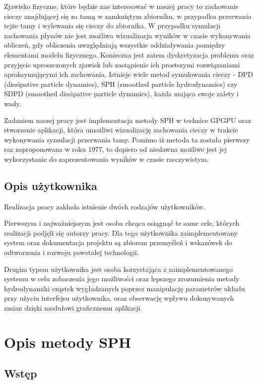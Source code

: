 \documentclass[polish, 12pt]{aghthesis}
\begin{document}
	Zjawisko fizyczne, które będzie nas interesować w naszej pracy to zachowanie cieczy znajdującej się za tamą w zamkniętym zbiorniku, w przypadku przerwania tejże tamy i wylewania się cieczy do zbiornika. W przypadku symulacji zachowania płynów nie jest możliwa wizualizacja wyników w czasie wykonywania obliczeń, gdy obliczenia uwzględniają wszystkie oddziaływania pomiędzy elementami modelu fizycznego. Konieczna jest zatem dyskretyzacja problemu oraz przyjęcie uproszczonych zjawisk lub zastąpienie ich prostszymi rozwiązaniami aproksymującymi ich zachowania. Istnieje wiele metod symulowania cieczy - DPD (dissipative particle dynamics), SPH (smoothed particle hydrodynamics) czy SDPD (smoothed dissipative particle dynamics), każda mająca swoje zalety i wady.

	Zadaniem naszej pracy jest implementacja metody SPH w technice GPGPU oraz stworzenie aplikacji, która umożliwi wizualizację zachowania cieczy w trakcie wykonywania symulacji przerwania tamy. Pomimo iż metoda ta została pierwszy raz zaproponowana w roku 1977, to dopiero od niedawna możliwe jest jej wykorzystanie do zaprezentowania wyników w czasie rzeczywistym.

\subsection{Opis użytkownika}
	
	Realizacja pracy zakłada istnienie dwóch rodzajów użytkowników.
	
	Pierwszym i najważniejszym jest osoba chcąca osiągnąć te same cele, których realizacji podjęli się autorzy pracy. Dla tego użytkownika zaimplementowany system oraz dokumentacja projektu są zbiorem przemyśleń i wskazówek do odtworzenia i rozwoju powstałej technologii.
	
	Drugim typem użytkownika jest osoba korzystająca z zaimplementowanego systemu w celu zobaczenia jego możliwości oraz lepszego zrozumienia metody hydrodynamiki cząstek wygładzanych poprzez manipulację parametrów układu przy użyciu interfejsu użytkownika, oraz obserwację wpływu dokonywanych zmian dzięki modułowi graficznemu aplikacji.
	
\section{Opis metody SPH}
\subsection{Wstęp}
			
\end{document}
